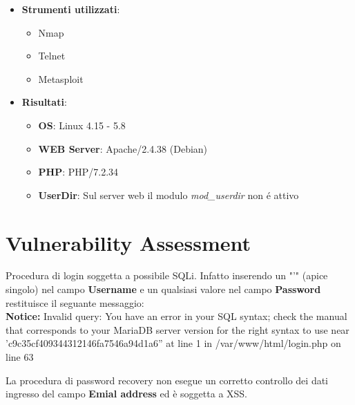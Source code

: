 \documentclass[12pt]{article}
\begin{document}
\begin{itemize}
\begin{itemize}
\begin{lstlisting}[label=shell, basicstyle=\tiny]
            \end{lstlisting}  
        \end{itemize}

        \item \textbf{Strumenti utilizzati}:
        \begin{itemize}
            \item Nmap
            \item Telnet
            \item Metasploit
        \end{itemize}
        \item \textbf{Risultati}:
        \begin{itemize}
            \item \textbf{OS}: Linux 4.15 - 5.8
            \item \textbf{WEB Server}: Apache/2.4.38 (Debian)
            \item \textbf{PHP}: PHP/7.2.34
            \item \textbf{UserDir}: Sul server web il modulo \textit{mod\_userdir} non \'{e} attivo
        \end{itemize}
    \end{itemize}

\section{Vulnerability Assessment}

Procedura di login soggetta a possibile SQLi. Infatto inserendo un "'" (apice singolo)
nel campo \textbf{Username} e un qualsiasi valore nel campo \textbf{Password} restituisce 
il seguante messaggio: \\
\textbf{Notice:} Invalid query: You have an error in your SQL syntax; check the manual that 
corresponds to your MariaDB server version for the right syntax to use near 
'c9c35cf409344312146fa7546a94d1a6'' at line 1 in /var/www/html/login.php on line 63

La procedura di password recovery non esegue un corretto controllo dei dati ingresso 
del campo \textbf{Emial address} ed \`{e} soggetta a XSS.
\end{document}
